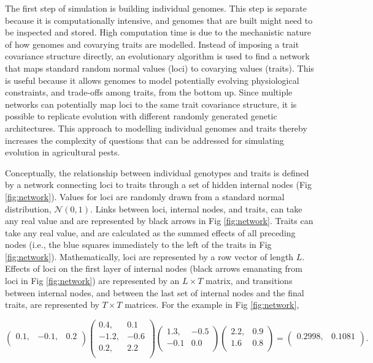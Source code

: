 \documentclass[10pt,letterpaper]{article}
\begin{document}
The first step of simulation is building individual genomes.
This step is separate because it is computationally intensive, and genomes that are built might need to be inspected and stored.
High computation time is due to the mechanistic nature of how genomes and covarying traits are modelled.
Instead of imposing a trait covariance structure directly, an evolutionary algorithm is used to find a network that maps standard random normal values (loci) to covarying values (traits).
This is useful because it allows genomes to model potentially evolving physiological constraints, and trade-offs among traits, from the bottom up.
Since multiple networks can potentially map loci to the same trait covariance structure, it is possible to replicate evolution with different randomly generated genetic architectures.
This approach to modelling individual genomes and traits thereby increases the complexity of questions that can be addressed for simulating evolution in agricultural pests.

Conceptually, the relationship between individual genotypes and traits is defined by a network connecting loci to traits through a set of hidden internal nodes (Fig \ref{fig:network}).
Values for loci are randomly drawn from a standard normal distribution, \(\mathcal{N}\left(0, 1\right)\).
Links between loci, internal nodes, and traits, can take any real value and are represented by black arrows in Fig \ref{fig:network}.
Traits can take any real value, and are calculated as the summed effects of all preceding nodes (i.e., the blue squares immediately to the left of the traits in Fig \ref{fig:network}).
Mathematically, loci are represented by a row vector of length \(L\).
Effects of loci on the first layer of internal nodes (black arrows emanating from loci in Fig \ref{fig:network}) are represented by an \(L \times T\) matrix, and transitions between internal nodes, and between the last set of internal nodes and the final traits, are represented by \(T \times T\) matrices.
For the example in Fig \ref{fig:network},

\[
\begin{pmatrix}
  0.1, & -0.1, & 0.2 \\
\end{pmatrix} 
\begin{pmatrix}
  0.4, &  0.1 \\
 -1.2, & -0.6 \\
  0.2, &  2.2 \\
\end{pmatrix}
\begin{pmatrix}
   1.3, & -0.5 \\
  -0.1  &  0.0 \\
\end{pmatrix}
\begin{pmatrix}
   2.2, &  0.9 \\
   1.6  &  0.8 \\
\end{pmatrix} = 
\begin{pmatrix}
  0.2998, & 0.1081 \\
\end{pmatrix}.
\]
\end{document}
